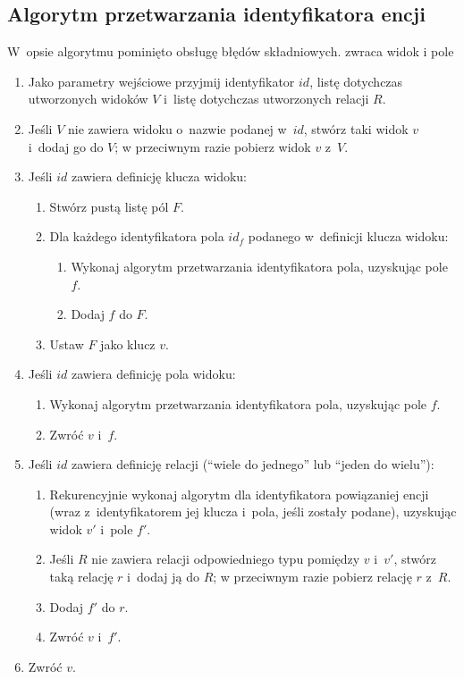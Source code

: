 \subsection{Algorytm przetwarzania identyfikatora encji}

W~opsie algorytmu pominięto obsługę błędów składniowych.
zwraca widok i pole

\begin{enumerate}
 \item Jako parametry wejściowe przyjmij identyfikator $id$, listę dotychczas utworzonych widoków $V$ i~listę dotychczas utworzonych relacji $R$.
 \item Jeśli $V$ nie zawiera widoku o~nazwie podanej w~$id$, stwórz taki widok $v$ i~dodaj go do $V$; w przeciwnym razie pobierz widok $v$ z~$V$.
 \item Jeśli $id$ zawiera definicję klucza widoku:
  \begin{enumerate}
   \item Stwórz pustą listę pól $F$.
   \item Dla każdego identyfikatora pola $id_f$ podanego w~definicji klucza widoku:
    \begin{enumerate}
     \item Wykonaj algorytm przetwarzania identyfikatora pola, uzyskując pole $f$.
     \item Dodaj $f$ do $F$.
    \end{enumerate}
   \item Ustaw $F$ jako klucz $v$.
  \end{enumerate}
 \item Jeśli $id$ zawiera definicję pola widoku:
  \begin{enumerate}
   \item Wykonaj algorytm przetwarzania identyfikatora pola, uzyskując pole $f$.
   \item Zwróć $v$ i~$f$.
  \end{enumerate}
 \item Jeśli $id$ zawiera definicję relacji (``wiele do jednego'' lub ``jeden do wielu''):
  \begin{enumerate}
   \item Rekurencyjnie wykonaj algorytm dla identyfikatora powiązaniej encji (wraz z~identyfikatorem jej klucza i~pola, jeśli zostały podane), uzyskując widok $v'$ i~pole $f'$.
   \item Jeśli $R$ nie zawiera relacji odpowiedniego typu pomiędzy $v$ i~$v'$, stwórz taką relację $r$ i~dodaj ją do $R$; w przeciwnym razie pobierz relację $r$ z~$R$.
   \item Dodaj $f'$ do $r$.
   \item Zwróć $v$ i~$f'$.
  \end{enumerate}
 \item Zwróć $v$.
\end{enumerate}


